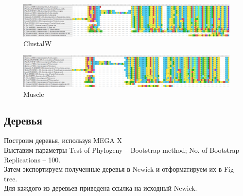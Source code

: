 \begin{figure}[!h]
	\includegraphics[width=1\linewidth]{Pics/RL7_ClustalW.png}
	\caption{ClustalW}
\end{figure}

\begin{figure}[!h]
	\includegraphics[width=1\linewidth]{Pics/RL7_Muscle.png}
	\caption{Muscle}
\end{figure}


\subsection*{Деревья}
Построим деревья, используя MEGA X\\
Выставим параметры Test of Phylogeny -- Bootstrap method; No. of Bootstrap Replications -- 100.\\
Затем экспортируем полученные деревья в Newick и отформатируем их в Fig tree.\\
Для каждого из деревьев приведена ссылка на исходный Newick.

